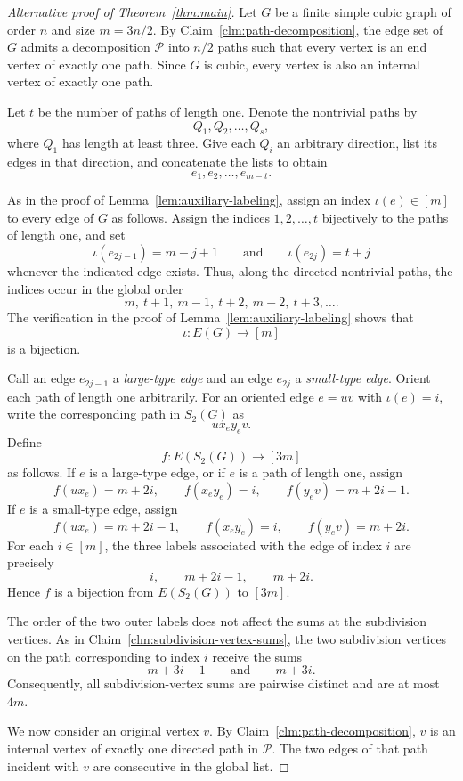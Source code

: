 \documentclass[preprint,12pt]{elsarticle}
\begin{document}
\begin{proof}[Alternative proof of Theorem~\ref{thm:main}]
Let \(G\) be a finite simple cubic graph of order \(n\) and size
\(m=3n/2\). By Claim~\ref{clm:path-decomposition}, the edge set of \(G\)
admits a decomposition \(\mathcal P\) into \(n/2\) paths such that every
vertex is an end vertex of exactly one path. Since \(G\) is cubic, every
vertex is also an internal vertex of exactly one path.

Let \(t\) be the number of paths of length one. Denote the nontrivial
paths by
\[
Q_1,Q_2,\ldots,Q_s,
\]
where \(Q_1\) has length at least three. Give each \(Q_i\) an arbitrary
direction, list its edges in that direction, and concatenate the lists to
obtain
\[
e_1,e_2,\ldots,e_{m-t}.
\]

As in the proof of Lemma~\ref{lem:auxiliary-labeling}, assign an index
\(\iota(e)\in[m]\) to every edge of \(G\) as follows. Assign the indices
\(1,2,\ldots,t\) bijectively to the paths of length one, and set
\[
\iota(e_{2j-1})=m-j+1
\qquad\text{and}\qquad
\iota(e_{2j})=t+j
\]
whenever the indicated edge exists. Thus, along the directed nontrivial
paths, the indices occur in the global order
\[
m,\ t+1,\ m-1,\ t+2,\ m-2,\ t+3,\ldots.
\]
The verification in the proof of Lemma~\ref{lem:auxiliary-labeling}
shows that
\[
\iota:E(G)\longrightarrow[m]
\]
is a bijection.

Call an edge \(e_{2j-1}\) a \emph{large-type edge} and an edge \(e_{2j}\)
a \emph{small-type edge}. Orient each path of length one arbitrarily. For
an oriented edge \(e=uv\) with \(\iota(e)=i\), write the corresponding
path in \(S_2(G)\) as
\[
u x_e y_e v.
\]
Define
\[
f:E(S_2(G))\longrightarrow[3m]
\]
as follows. If \(e\) is a large-type edge, or if \(e\) is a path of
length one, assign
\[
f(ux_e)=m+2i,\qquad
f(x_e y_e)=i,\qquad
f(y_e v)=m+2i-1.
\]
If \(e\) is a small-type edge, assign
\[
f(ux_e)=m+2i-1,\qquad
f(x_e y_e)=i,\qquad
f(y_e v)=m+2i.
\]
For each \(i\in[m]\), the three labels associated with the edge of index
\(i\) are precisely
\[
i,\qquad m+2i-1,\qquad m+2i.
\]
Hence \(f\) is a bijection from \(E(S_2(G))\) to \([3m]\).

The order of the two outer labels does not affect the sums at the
subdivision vertices. As in Claim~\ref{clm:subdivision-vertex-sums}, the
two subdivision vertices on the path corresponding to index \(i\) receive
the sums
\[
m+3i-1
\qquad\text{and}\qquad
m+3i.
\]
Consequently, all subdivision-vertex sums are pairwise distinct and are
at most \(4m\).

We now consider an original vertex \(v\). By
Claim~\ref{clm:path-decomposition}, \(v\) is an internal vertex of
exactly one directed path in \(\mathcal P\). The two edges of that path
incident with \(v\) are consecutive in the global list.


\end{proof}
\end{document}
